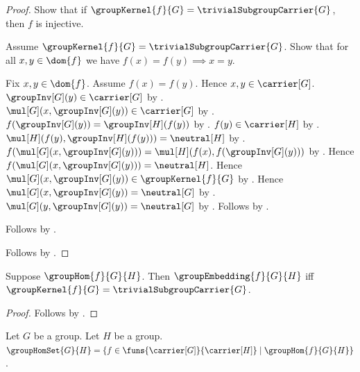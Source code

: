 \begin{proof}
    Show that if $\groupKernel{f}{G}=\trivialSubgroupCarrier{G}$,
        then $f$ is injective.
    \begin{subproof}
        Assume
            $\groupKernel{f}{G}=\trivialSubgroupCarrier{G}$.
        Show that for all $x,y\in\dom{f}$ we have
            $f(x)=f(y)\implies x=y$.
        \begin{subproof}
            Fix $x,y\in\dom{f}$.
            Assume $f(x)=f(y)$.
            Hence $x,y\in\carrier[G]$.
            $\groupInv[G](y)\in\carrier[G]$ by
                .
            $\mul[G](x,\groupInv[G](y))\in\carrier[G]$ by
                .
            $f(\groupInv[G](y))=\groupInv[H](f(y))$ by
                .
            $f(y)\in\carrier[H]$ by
                .
            $\mul[H](f(y),\groupInv[H](f(y)))=\neutral[H]$ by
                .
            $f(\mul[G](x,\groupInv[G](y)))=
                \mul[H](f(x),f(\groupInv[G](y)))$ by
                .
            Hence $f(\mul[G](x,\groupInv[G](y)))=\neutral[H]$.
            Hence
                $\mul[G](x,\groupInv[G](y))
                    \in\groupKernel{f}{G}$ by
                .
            Hence
                $\mul[G](x,\groupInv[G](y))=\neutral[G]$ by
                .
            $\mul[G](y,\groupInv[G](y))=\neutral[G]$ by
                .
            Follows by .
        \end{subproof}
        Follows by .
    \end{subproof}
    Follows by \auto.
\end{proof}

\begin{corollary}\label{group_embedding_iff_kernel_trivial}
    Suppose $\groupHom{f}{G}{H}$.
    Then $\groupEmbedding{f}{G}{H}$ iff
        $\groupKernel{f}{G}=\trivialSubgroupCarrier{G}$.
\end{corollary}
\begin{proof}
    Follows by
        .
\end{proof}

\begin{definition}\label{group_hom_set}
    Let $G$ be a group.
    Let $H$ be a group.
    $\groupHomSet{G}{H}=
        \{f\in\funs{\carrier[G]}{\carrier[H]}
            \mid \groupHom{f}{G}{H}\}$.
\end{definition}

